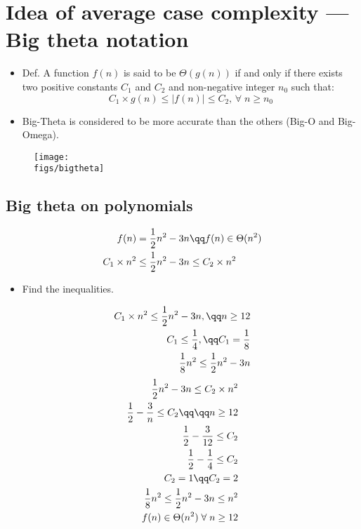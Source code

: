 \section{Idea of average case complexity — Big theta notation}
\begin{itemize}
    \item Def. A function $f(n)$ is said to be $\Theta(g(n))$ if and only if there exists two positive constants $C_1$ and $C_2$ and non-negative integer $n_0$ such that:  
        \[
          C_1\times g(n) \leq \left| f(n) \right| \leq C_2, \, \forall \; n \geq n_0
        \]
    
    \item Big-Theta is considered to be more accurate than the others (Big-O and Big-Omega).
\end{itemize}

\begin{figure}[H]
    \centering
    \texttt{[image: \\figs/bigtheta]} 
\end{figure}

\subsection{Big theta on polynomials}
\begin{center}
   \begin{align*}
       f(n) &= \frac{1}{2}n^2 - 3n \qq f(n) \in \Theta(n^2) \\ 
       C_1\times n^2 &\leq \frac{1}{2} n^2 - 3n \leq C_2\times n^2 \\ 
   \end{align*}
   \begin{itemize}
       \item Find the inequalities.
   \end{itemize}
   \begin{align*}
        C_1\times n^2 \leq \frac{1}{2} n^2 - 3n, \qq n \geq 12 \\
        C_1 \leq \frac{1}{4}, \qq C_1 = \frac{1}{8} \\ 
        \frac{1}{8} n^2 \leq \frac{1}{2}n^2-3n \\  
   \end{align*}
   \begin{align*}
        \frac{1}{2} n^2 - 3n \leq C_2\times n^2 \\ 
        \frac{1}{2} - \frac{3}{n} \leq C_2 \qq  \qq n \geq 12 \\ 
        \frac{1}{2} - \frac{3}{12} \leq C_2  \\ 
        \frac{1}{2} - \frac{1}{4} \leq C_2 \\ 
        C_2 = 1 \qq C_2 = 2\\  
        \frac{1}{8} n^2 \leq \frac{1}{2} n^2 - 3n \leq n^2 \\ 
        f(n) \in \Theta(n^2) \;\forall \; n \geq 12 \\ 
   \end{align*}
\end{center}
